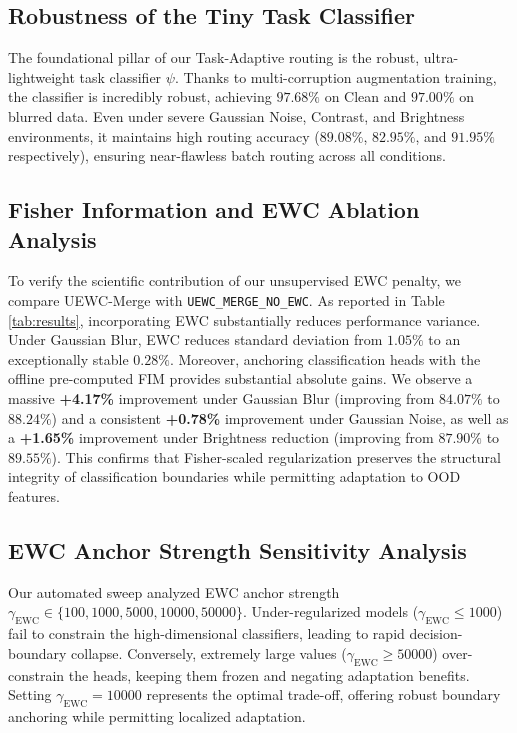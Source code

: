 \documentclass{article}
\theoremstyle{plain}
\theoremstyle{definition}
\theoremstyle{remark}
\begin{document}
\subsection{Robustness of the Tiny Task Classifier}
The foundational pillar of our Task-Adaptive routing is the robust, ultra-lightweight task classifier $\psi$. Thanks to multi-corruption augmentation training, the classifier is incredibly robust, achieving $97.68\%$ on Clean and $97.00\%$ on blurred data. Even under severe Gaussian Noise, Contrast, and Brightness environments, it maintains high routing accuracy ($89.08\%$, $82.95\%$, and $91.95\%$ respectively), ensuring near-flawless batch routing across all conditions.

\subsection{Fisher Information and EWC Ablation Analysis}
To verify the scientific contribution of our unsupervised EWC penalty, we compare UEWC-Merge with \texttt{UEWC\_MERGE\_NO\_EWC}. As reported in Table \ref{tab:results}, incorporating EWC substantially reduces performance variance. Under Gaussian Blur, EWC reduces standard deviation from $1.05\%$ to an exceptionally stable $0.28\%$. Moreover, anchoring classification heads with the offline pre-computed FIM provides substantial absolute gains. We observe a massive \textbf{+4.17\%} improvement under Gaussian Blur (improving from $84.07\%$ to $88.24\%$) and a consistent \textbf{+0.78\%} improvement under Gaussian Noise, as well as a \textbf{+1.65\%} improvement under Brightness reduction (improving from $87.90\%$ to $89.55\%$). This confirms that Fisher-scaled regularization preserves the structural integrity of classification boundaries while permitting adaptation to OOD features.

\subsection{EWC Anchor Strength Sensitivity Analysis}
Our automated sweep analyzed EWC anchor strength $\gamma_{\text{EWC}} \in \{100, 1000, 5000, 10000, 50000\}$. Under-regularized models ($\gamma_{\text{EWC}} \le 1000$) fail to constrain the high-dimensional classifiers, leading to rapid decision-boundary collapse. Conversely, extremely large values ($\gamma_{\text{EWC}} \ge 50000$) over-constrain the heads, keeping them frozen and negating adaptation benefits. Setting $\gamma_{\text{EWC}} = 10000$ represents the optimal trade-off, offering robust boundary anchoring while permitting localized adaptation.
\end{document}
